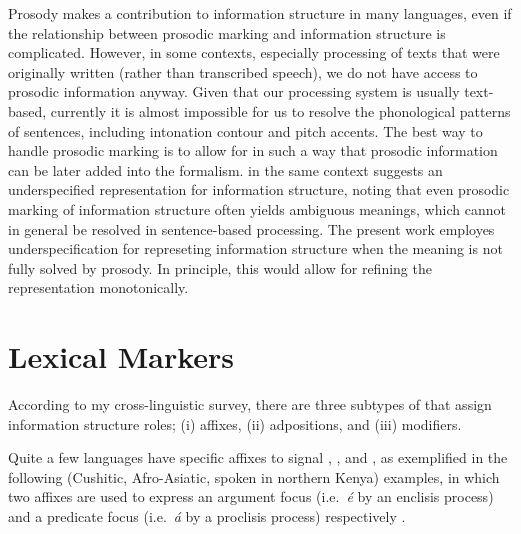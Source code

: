 Prosody makes a contribution to information structure in many
languages, even if the relationship between prosodic
marking and information structure is complicated. However, in some
contexts, especially processing of texts that were originally written
(rather than transcribed speech), we do not have access to prosodic
information anyway.  Given that our processing system is usually
text-based, currently it is almost impossible for us to resolve the
phonological patterns of sentences, including intonation contour and
pitch accents.  The best way to handle prosodic marking is to allow
for  in such a way that prosodic information
can be later added into the formalism.  \citet{kuhn:96} in the same
context suggests an underspecified representation for information
structure, noting that even prosodic marking of information structure
often yields ambiguous meanings, which cannot in general be resolved
in sentence-based processing.  The present work employes
underspecification for represeting information structure when the
meaning is not fully solved by prosody.
In principle, this would allow for refining the representation monotonically.



\section{Lexical Markers}
\label{4:sec:lexical}


According to my cross-linguistic survey, there are three subtypes of
 that assign information structure roles; (i) affixes,
(ii) adpositions, and (iii) modifiers.

Quite a few languages have specific affixes to signal , ,
and , as exemplified in the following  (Cushitic,
Afro-Asiatic, spoken in northern Kenya) examples, in which two affixes
are used to express an argument focus (i.e.\ \textit{{\'e}} by an
enclisis process) and a predicate focus (i.e.\ \textit{{\'a}} by a
proclisis process) respectively \citep{lecarme:99}.




